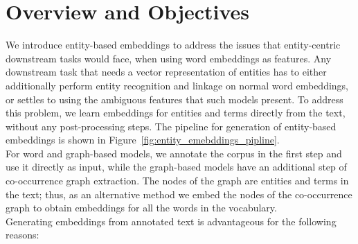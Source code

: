 \section{Overview and Objectives}\label{sec:entity_overview}
We introduce entity-based embeddings to address the issues that entity-centric downstream tasks would face, when using word embeddings as features. Any downstream task that needs a vector representation of entities has to either additionally perform entity recognition and linkage on normal word embeddings, or settles to using the ambiguous features that such models present. To address this problem, we learn embeddings for entities and terms directly from the text, without any post-processing steps. The pipeline for generation of entity-based embeddings is shown in Figure~\ref{fig:entity_emebddings_pipline}.\\
For word and graph-based models, we annotate the corpus in the first step and use it directly as input, while the graph-based models have an additional step of co-occurrence graph extraction. The nodes of the graph are entities and terms in the text; thus, as an alternative method we embed the nodes of the co-occurrence graph to obtain embeddings for all the words in the vocabulary. \\
Generating embeddings from annotated text is advantageous for the following reasons:
